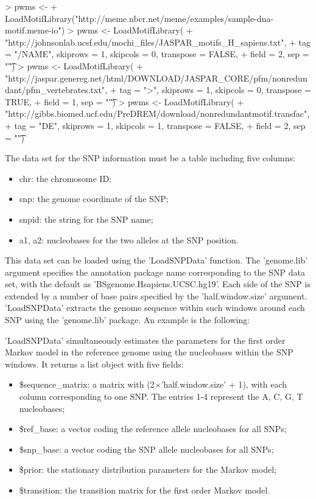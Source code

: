 \documentclass[a4paper,10pt]{article}
\begin{document}
\begin{Schunk}
\begin{Sinput}
> pwms <- 
+   LoadMotifLibrary("http://meme.nbcr.net/meme/examples/sample-dna-motif.meme-io")
> pwms <- LoadMotifLibrary(
+            "http://johnsonlab.ucsf.edu/mochi_files/JASPAR_motifs_H_sapiens.txt",
+                          tag = "/NAME", skiprows = 1, skipcols = 0, transpose = FALSE, 
+                          field = 2, sep = "\t")
> pwms <- LoadMotifLibrary(
+ "http://jaspar.genereg.net/html/DOWNLOAD/JASPAR_CORE/pfm/nonredundant/pfm_vertebrates.txt",
+                          tag = ">", skiprows = 1, skipcols = 0, transpose = TRUE,
+                          field = 1, sep = "\t")
> pwms <- LoadMotifLibrary(
+            "http://gibbs.biomed.ucf.edu/PreDREM/download/nonredundantmotif.transfac",
+                          tag = "DE", skiprows = 1, skipcols = 1, transpose = FALSE,
+                          field = 2, sep = "\t")
\end{Sinput}
\end{Schunk}

The data set for the SNP information must be a table including five columns:

\begin{itemize}
\item chr: the chromosome ID;
\item snp: the genome coordinate of the SNP;
\item snpid: the string for the SNP name;
\item a1, a2: nucleobases for the two alleles at the SNP position.
\end{itemize}
  
This data set can be loaded using the 'LoadSNPData' function. The 'genome.lib' argument specifies the annotation package name corresponding to the SNP data set, with the default as 'BSgenome.Hsapiens.UCSC.hg19'. Each side of the SNP is extended by a number of base pairs specified by the 'half.window.size' argument. 'LoadSNPData' extracts the genome sequence within such windows around each SNP using the 'genome.lib' package. An example is the following:


'LoadSNPData' simultaneously estimates the parameters for the first order Markov model in the reference genome using the nucleobases within the SNP windows. It returns a list object with five fields:

\begin{itemize}
\item \$sequence\_matrix: a matrix with (2$\times$'half.window.size' + 1), with each column corresponding to one SNP. The entries 1-4 represent the A, C, G, T nucleobases;
\item \$ref\_base: a vector coding the reference allele nucleobases for all SNPs;
\item \$snp\_base: a vector coding the SNP allele nucleobases for all SNPs;
\item \$prior: the stationary distribution parameters for the Markov model;
\item \$transition: the transition matrix for the first order Markov model.
\end{itemize}
\end{document}
